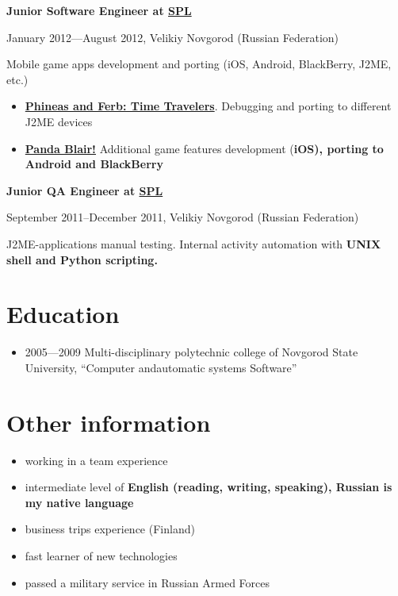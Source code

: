 \vspace{5pt}

{
\fontsize{12pt}{12pt}\selectfont
\bfseries Junior Software Engineer at
\href{http://spl.co}{\bfseries SPL\mdseries}
\mdseries
}

{
\fontsize{9pt}{8pt}\selectfont
January 2012---August 2012, Velikiy Novgorod (Russian Federation)
}

Mobile game apps development and porting
(iOS, Android, BlackBerry, J2ME, etc.)

\begin{itemize}

\setlength{\itemindent}{20pt}
\item
    \href{http://java.mob.org/game/phineas\_and\_ferb\_time\_travelers.html}
        {\bfseries Phineas and Ferb: Time Travelers\mdseries}.
        Debugging and porting to different J2ME devices
\item
    \href{https://itunes.apple.com/us/app/panda-blair!/id500995558?mt=8}
        {\bfseries Panda Blair!\mdseries}
        Additional game features development (\bfseries iOS\mdseries),
        porting to \bfseries Android \mdseries and \bfseries BlackBerry\mdseries
\end{itemize}

\vspace{5pt}

{
\fontsize{12pt}{12pt}\selectfont
\bfseries Junior QA Engineer at
\href{http://spl.co}{\bfseries SPL\mdseries}
\mdseries
}

{
\fontsize{9pt}{8pt}\selectfont
September 2011--December 2011, Velikiy Novgorod (Russian Federation)
}

J2ME-applications manual testing. Internal activity automation with
\bfseries UNIX shell \mdseries and \bfseries Python \mdseries scripting.

\section{Education}
\begin{itemize}
\item 2005---2009 Multi-disciplinary polytechnic college of
Novgorod State University,
``Computer and\linebreak automatic systems Software''
\end{itemize}

\section{Other information}
\begin{itemize}
\item working in a team experience
\item intermediate level of \bfseries English \mdseries (reading, writing, speaking),
Russian is my native language
\item business trips experience (Finland)
\item fast learner of new technologies
\item passed a military service in Russian Armed Forces
\end{itemize}

